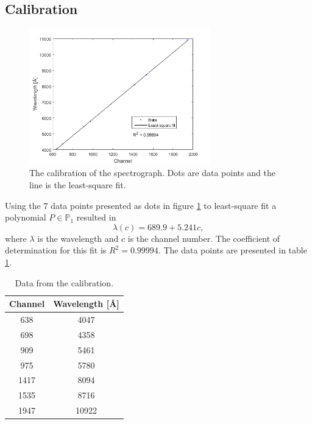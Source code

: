 \documentclass[12pt]{article}
\begin{document}
\subsection{Calibration}
\begin{figure}[ht]
    \centering
    \includegraphics[width=0.7\textwidth]{calibration}
    
    \caption{The calibration of the spectrograph. Dots are data points and the line is the least-square fit.}
    \label{figure:calibration}
\end{figure}

Using the $7$ data points presented as dots in figure \ref{figure:calibration} to least-square fit a polynomial $P \in \mathbb{P}_1$ resulted in
\begin{equation}
  \lambda(c) = 689.9 + 5.241c,
\end{equation}
where $\lambda$ is the wavelength and $c$ is the channel number. The coefficient of determination for this fit is $R^2 = 0.99994$. The data points are presented in table \ref{table:calibration}.

\begin{table}
\centering
\begin{tabular}{| c | c | }
    \hline
    Channel & Wavelength [Å] \\ \hline
    638 & 4047 \\ \hline
    698 & 4358 \\ \hline
    909 & 5461 \\ \hline
    975 & 5780 \\ \hline
    1417 & 8094 \\ \hline
    1535 & 8716 \\ \hline
    1947 & 10922 \\ \hline
\end{tabular}
\caption{Data from the calibration.}
\label{table:calibration}
\end{table}
\end{document}
